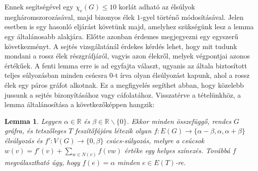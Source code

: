 \documentclass[12pt, a4paper]{report}
\newtheorem{lem}[tét]{Lemma}
\theoremstyle{remark}
\theoremstyle{definition}
\begin{document}
Ennek segítségével egy $\chi_e(G) \leq 10$ korlát adható az élsúlyok megháromszorozásával, majd bizonyos élek $1$-gyel történő módosításával. Jelen esetben is egy hasonló eljárást követünk majd, amelyhez szükségünk lesz a lemma egy általánosabb alakjára. Előtte azonban érdemes megjegyezni egy egyszerű következményt. A sejtés vizsgálatánál érdekes kérdés lehet, hogy mit tudunk mondani a rossz élek részgráfjáról, vagyis azon élekről, melyek végpontjai azonos értékűek. A fenti lemma erre is ad egyfajta választ, ugyanis az általa biztosított teljes súlyozásban minden csúcsra $0$-t írva olyan élsúlyozást kapunk, ahol a rossz élek egy páros gráfot alkotnak. Ez a megfigyelés segíthet abban, hogy közelebb jussunk a sejtés bizonyításához vagy cáfolatához. Visszatérve a tételünkhöz, a lemma általánosítása a következőképpen hangzik:

\begin{lem}
Legyen $\alpha \in \mathbb{R}$ és $\beta \in \mathbb{R} \smallsetminus \lbrace 0 \rbrace$. Ekkor minden összefüggő, rendes $G$ gráfra, és tetszőleges $T$ feszítőfájára létezik olyan $f:E(G) \rightarrow \lbrace \alpha - \beta, \alpha, \alpha + \beta \rbrace$ élsúlyozás és $f':V(G) \rightarrow \lbrace 0, \beta \rbrace$ csúcs-súlyozás, melyre a csúcsok $w(v) = f'(v) + \sum\limits_{w \in N(v)} f(vw)$ értéke egy helyes színezés. Továbbá $f$ megválasztható úgy, hogy $f(e) = \alpha$ minden $e \in E(T)$-re.
\end{lem}
\end{document}

